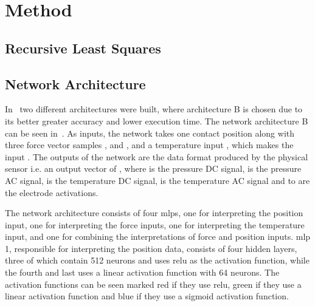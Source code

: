 \section{Method}\label{sec:1-tactile-perception-method}

\subsection{Recursive Least Squares} \label{sec:1-tactile-perception-recirsive-least-squares}




\subsection{Network Architecture}\label{sec:1-tactile-perception-method-network-architecture}
In~\cite{simulation-of-the-syntouch-biotac-sensor} two different architectures were built, where architecture B is chosen due to its better greater accuracy and lower execution time. The network architecture B can be seen in~. As inputs, the network takes one contact position  along with three force vector samples ,  and , and a temperature input , which makes the input . The outputs of the network are the data format produced by the physical sensor i.e. an output vector of , where  is the pressure DC signal,  is the pressure AC signal,  is the temperature DC signal,  is the temperature AC signal and  to  are the electrode activations.

The network architecture consists of four \gls{mlp}s, one for interpreting the position input, one for interpreting the force inputs, one for interpreting the temperature input, and one for combining the interpretations of force and position inputs. \gls{mlp} \num{1}, responsible for interpreting the position data, consists of four hidden layers, three of which contain \num{512} neurons and uses \gls{relu} as the activation function, while the fourth and last uses a linear activation function with \num{64} neurons. The activation functions can be seen marked red if they use \gls{relu}, green if they use a linear activation function and blue if they use a sigmoid activation function. \medskip

